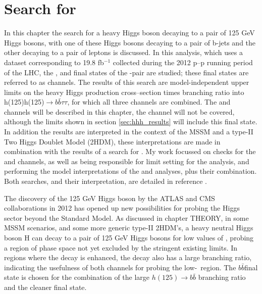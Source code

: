 \chapter{\texorpdfstring{Search for \Htohhtobbtautau}{Search for H -> hh -> bbtautau}}
\label{chap:hhh}
In this chapter the search for a heavy Higgs boson decaying to a pair of 125 GeV Higgs bosons, with one of these Higgs bosons decaying to 
a pair of b-jets and the other decaying to a pair of \Ptau leptons is discussed. In this analysis, which 
uses a dataset corresponding to 19.8 fb$^{-1}$ collected during the 2012 p--p running
period of the \ac{LHC}, the \etau, \mutau and \tautau final states
of the \Pgt-pair are studied; these final states are referred to as channels. 
The results of this search are model-independent
upper limits on the heavy Higgs production cross--section times branching ratio into h(125)h(125)$\rightarrow b\bar{b} \tau\tau$, for
which all three channels are combined. The \etau and \mutau channels will be described in this chapter, the \tautau channel will not
be covered, although the limits shown in section \ref{sec:hhh_results} will include this final state.
In addition  the results are interpreted in the context of the MSSM and a type-II Two Higgs Doublet Model (2HDM), 
these interpretations are made in combination with the results of a search for \AtoZhtolltautau \cite{CMS-HIG-14-034}. 
My work focussed on checks for the \mutau and \etau channels, as well as being
responsible for limit setting for the \Htohh analysis, and performing the model interpretations
of the \Htohh and \AtoZh analyses, plus their combination.
Both searches, and their interpretation, are detailed in reference \cite{CMS-HIG-14-034}.

The discovery of the 125 GeV Higgs boson by the ATLAS and CMS collaborations in 2012 \cite{HDiscoveryAtlas,HDiscoveryCMS} has opened up
new possibilities for probing the Higgs sector beyond the Standard Model. As discussed in chapter THEORY, in some MSSM scenarios, and some more
generic type-II 2HDM's, a heavy neutral Higgs boson H can decay to a pair of 125 GeV Higgs bosons for low values
of \tanb, probing a region of phase space not yet excluded by the stringent existing limits. In regions where
the decay \Htohh is enhanced, the \AtoZh decay also has a large branching ratio, indicating the usefulness
of both channels for probing the low-\tanb~region. The $b\bar{b}$\tautau final state is chosen for the combination
of the large $h(125) \rightarrow b\bar{b}$ branching ratio and the cleaner \htotautau final state.

